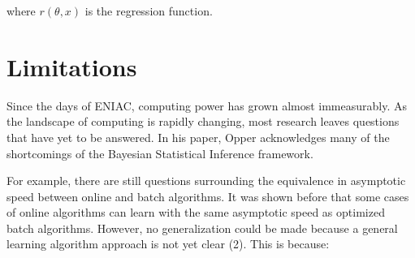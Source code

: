 																																																																																																																																																																																																																     \noindent where $r(\theta,x)$ is the regression function. 
																																																																																																																																																																																																																	     
																																																																																																																																																																																																																		 \section{Limitations}

																																																																																																																																																																																																																		     Since the days of ENIAC, computing power has grown almost immeasurably. As the landscape of computing is rapidly changing, most research leaves questions that have yet to be answered. In his paper, Opper acknowledges many of the shortcomings of the Bayesian Statistical Inference framework. \vspace{4mm}
																																																																																																																																																																																																																			     
																																																																																																																																																																																																																				     \noindent For example, there are still questions surrounding the equivalence in asymptotic speed between online and batch algorithms. It was shown before that some cases of online algorithms can learn with the same asymptotic speed as optimized batch algorithms. However, no generalization could be made because a general learning algorithm approach is not yet clear (2). This is because: 
																																																																																																																																																																																																																					     
